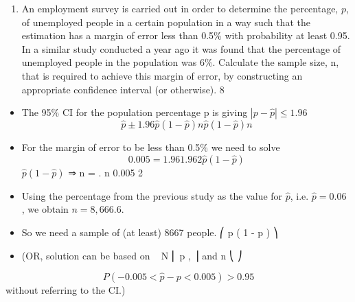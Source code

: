 \documentclass[a4paper,12pt]{article}
\begin{document}
\begin{enumerate}
\item An employment survey is carried out in order to determine the percentage, $p$, of
unemployed people in a certain population in a way such that the estimation has a margin of error less than 0.5\% with probability at least 0.95. In a similar study conducted a year ago it was found that the percentage of unemployed people in the
population was 6\%. Calculate the sample size, n, that is required to achieve this margin of error, by
constructing an appropriate confidence interval (or otherwise).
8



\end{enumerate}
\newpage

\begin{itemize}
\item The 95\% CI for the population percentage p is
giving $| p - \hat{p} | \leq 1.96$
\[ \hat{p} \pm 1.96
\hat{p} (1 - \hat{p} )
n
\hat{p} (1 - \hat{p} )
n\]
\item For the margin of error to be less than 0.5\% we need to solve
\[0.005 = 1.96
1.96 2 \hat{p} (1 - \hat{p} )\]
$\hat{p} (1 - \hat{p} )$
⇒ n =
.
n
0.005 2
\item Using the percentage from the previous study as the value for $\hat{p}$, i.e. $\hat{p} = 0.06$ , we obtain $n = 8,666.6$.
\item So we need a sample of (at least) 8667 people.
⎛ p ( 1 - p ) ⎞
\item (OR, solution can be based on  ~ N ⎜ p ,
⎟ and
n
⎝
⎠
\end{itemize}
\[P ( - 0.005 < \hat{p} - p < 0.005 ) > 0.95 \]without referring to the CI.)



\end{document}

